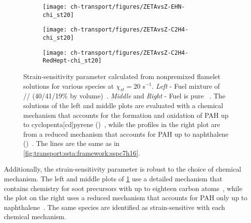 \begin{figure}[ht]
  \centering
  \begin{subfigure}[b]{0.33\linewidth}
    \texttt{[image: ch-transport/figures/ZETAvsZ-EHN-chi\_st20]}
  \end{subfigure}%
  \begin{subfigure}[b]{0.33\linewidth}
    \texttt{[image: ch-transport/figures/ZETAvsZ-C2H4-chi\_st20]}
  \end{subfigure}%
  \begin{subfigure}[b]{0.33\linewidth}
    \texttt{[image: ch-transport/figures/ZETAvsZ-C2H4-RedHept-chi\_st20]}
  \end{subfigure}
  \caption[Dependencies of Strain-Sensitivity Parameter \texorpdfstring{$\zeta_k$}{Zk} on Fuel Mixture and Chemical Mechanism]{Strain-sensitivity parameter calculated from nonpremixed flamelet solutions for various species at $\chi_{st} = 20$ s$^{-1}$. \textit{Left} - Fuel mixture of // (40/41/19\% by volume)~\cite{mahmoud2017}. \textit{Middle} and \textit{Right} - Fuel is pure ~\cite{shaddix2010,zhang2011}. The solutions of the left and middle plots are evaluated with a chemical mechanism that accounts for the formation and oxidation of PAH up to cyclopenta[cd]pyrene ()~\cite{blanquart2009588,narayanaswamy2010}, while the profiles in the right plot are from a reduced mechanism that accounts for PAH up to naphthalene ()~\cite{bisetti2012}. The lines are the same as in \cref{fig:transport:ssta:framework:sspc7h16}.} %
  \label{fig:transport:ssta:dependencies:fuelchem}
\end{figure}

Additionally, the strain-sensitivity parameter is robust to the choice of chemical mechanism. The left and middle plots of \cref{fig:transport:ssta:dependencies:fuelchem} use a detailed mechanism that contains chemistry for soot precursors with up to eighteen carbon atoms~\cite{blanquart2009588,narayanaswamy2010}, while the plot on the right uses a reduced mechanism that accounts for PAH only up to naphthalene~\cite{bisetti2012}. The same species are identified as strain-sensitive with each chemical mechanism. 


